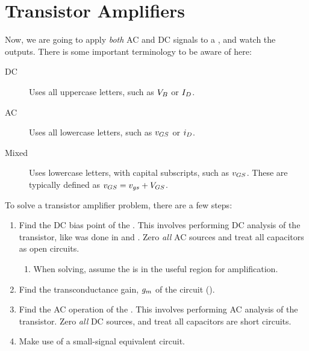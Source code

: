 \section{Transistor Amplifiers}\label{sec:Transistor_Amps}
Now, we are going to apply \emph{both} AC and DC signals to a , and watch the outputs.
There is some important terminology to be aware of here:
\begin{description}
\item[DC] Uses all uppercase letters, such as $\DCVoltage{\Base}$ or $\DCCurrent{\Drain}$.
\item[AC] Uses all lowercase letters, such as $\ACVoltage{\Gate\Source}$ or $\ACCurrent{\Drain}$.
\item[Mixed] Uses lowercase letters, with capital subscripts, such as $\SignalVoltage{GS}$.
  These are typically defined as $\SignalVoltage{GS} = \ACVoltage{GS} + \DCVoltage{GS}$.
\end{description}

To solve a transistor amplifier problem, there are a few steps:
\begin{enumerate}[noitemsep]
\item Find the DC bias point of the .
  This involves performing DC analysis of the transistor, like was done in  and .
  Zero \emph{all} AC sources and treat all capacitors as open circuits.
  \begin{enumerate}[noitemsep]
  \item When solving, assume the  is in the useful region for amplification.
  \end{enumerate}
\item Find the transconductance gain, $g_{m}$ of the circuit ().
\item Find the AC operation of the .
  This involves performing AC analysis of the transistor.
  Zero \emph{all} DC sources, and treat all capacitors are short circuits.
\item Make use of a small-signal equivalent circuit.
\end{enumerate}


